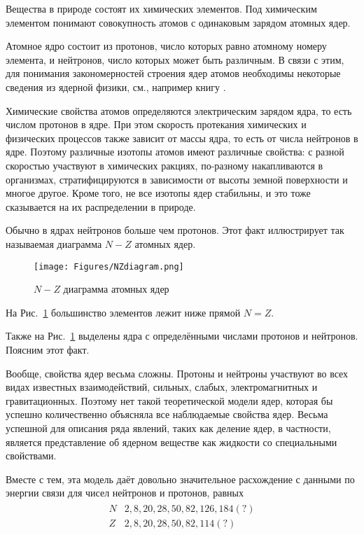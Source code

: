 \documentclass[a5paper,openany]{book}
\begin{document}
Вещества в природе состоят их химических элементов.
Под химическим элементом понимают совокупность атомов с одинаковым зарядом атомных ядер. 

Атомное ядро состоит из протонов, число которых равно атомному номеру элемента, и нейтронов, число которых может быть различным.  В связи с этим, для понимания закономерностей строения ядер атомов необходимы некоторые сведения из ядерной физики, см., например книгу \cite{NuclPhys}.

Химические свойства атомов определяются электрическим зарядом ядра, то есть числом протонов в ядре. При этом скорость протекания химических и физических процессов также зависит от массы ядра, то есть от числа нейтронов в ядре. Поэтому  различные изотопы атомов имеют различные свойства: с разной скоростью участвуют в химических ракциях, по-разному накапливаются в организмах, стратифицируются в зависимости от высоты земной поверхности и многое другое. Кроме того, не все изотопы ядер стабильны, и это тоже сказывается на их распределении в природе.

Обычно в ядрах нейтронов больше чем протонов. Этот факт иллюстрирует так называемая диаграмма $N-Z$ атомных ядер.

\begin{figure}[ht] 
	\centering\small
	\unitlength=1mm
	\texttt{[image: Figures/NZdiagram.png]} 
	\caption{$N-Z$ диаграмма  атомных ядер \cite{NuclPhys}} 
	\label{f:NZdiagram}
\end{figure}
На Рис.~\ref{f:NZdiagram} большинство элементов лежит ниже прямой $N=Z$.

Также на Рис.~\ref{f:NZdiagram} выделены ядра с определёнными числами протонов и нейтронов. Поясним этот факт.

Вообще, свойства ядер весьма сложны. Протоны и нейтроны участвуют во всех видах известных взаимодействий, сильных, слабых, электромагнитных и гравитационных. Поэтому нет такой теоретической модели ядер, которая бы успешно количественно объясняла все наблюдаемые свойства ядер.
Весьма успешной для описания ряда явлений, таких как деление ядер, в частности, является представление об ядерном веществе как жидкости со специальными свойствами. 

Вместе с тем, эта модель даёт довольно значительное расхождение с данными по энергии связи для чисел нейтронов и протонов, равных 
\begin{align*}
\begin{array}{cl}
N & 2, 8, 20, 28, 50, 82, 126, 184(?) \\
Z & 2, 8, 20, 28, 50, 82, 114(?)
\end{array}
\end{align*}
\end{document}
